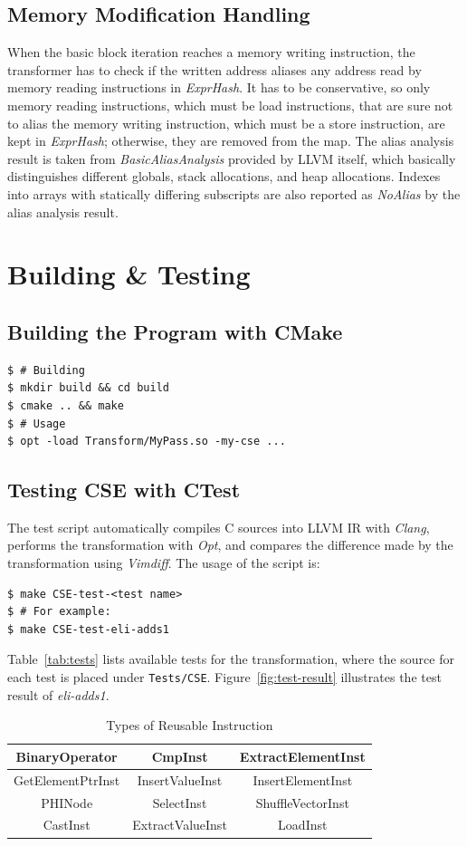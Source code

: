\documentclass[9pt,sigconf]{acmart}
\begin{document}
	\subsection{Memory Modification Handling}
	When the basic block iteration reaches a memory writing instruction, the transformer has to check if the written address aliases any address read by memory reading instructions in \textit{ExprHash}. It has to be conservative, so only memory reading instructions, which must be load instructions, that are sure not to alias the memory writing instruction, which must be a store instruction, are kept in \textit{ExprHash}; otherwise, they are removed from the map. The alias analysis result is taken from \textit{BasicAliasAnalysis} provided by LLVM itself, which basically distinguishes different globals, stack allocations, and heap allocations. Indexes into arrays with statically differing subscripts are also reported as \textit{NoAlias} by the alias analysis result.
	
	\section{Building \& Testing}
	\subsection{Building the Program with CMake}
	\begin{lstlisting}
$ # Building
$ mkdir build && cd build
$ cmake .. && make
$ # Usage
$ opt -load Transform/MyPass.so -my-cse ...
	\end{lstlisting}
	
	\subsection{Testing CSE with CTest}
	The test script automatically compiles C sources into LLVM IR with \textit{Clang}, performs the transformation with \textit{Opt}, and compares the difference made by the transformation using \textit{Vimdiff}. The usage of the script is:
	\begin{lstlisting}
$ make CSE-test-<test name>
$ # For example:
$ make CSE-test-eli-adds1
	\end{lstlisting}
	Table~\ref{tab:tests} lists available tests for the transformation, where the source for each test is placed under \texttt{Tests/CSE}. Figure~\ref{fig:test-result} illustrates the test result of \textit{eli-adds1}.
	
	\begin{table}[t]
		\caption{Types of Reusable Instruction}
		\label{tab:reusable-types}
		\begin{tabular}{|c|c|c|}
			\hline
			BinaryOperator & CmpInst & ExtractElementInst \\
			\hline
			GetElementPtrInst & InsertValueInst & InsertElementInst \\
			\hline
			PHINode & SelectInst & ShuffleVectorInst \\
			\hline
			CastInst & ExtractValueInst & LoadInst \\
			\hline
		\end{tabular}
	\end{table}
\end{document}
